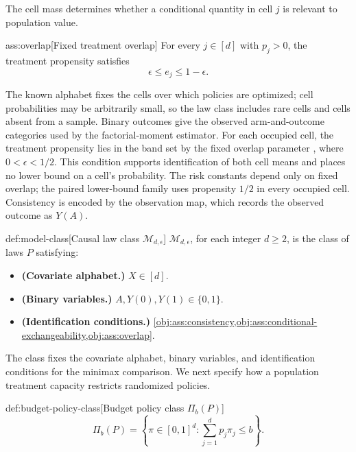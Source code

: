 \documentclass[11pt]{article}
\begin{document}
The cell mass  determines whether a conditional quantity in cell \(j\) is relevant to population value.

\begin{assumptionv}{ass:overlap}[Fixed treatment overlap]
For every \(j\in[d]\) with \(p_j>0\), the treatment propensity satisfies
\[
\epsilon\le e_j\le 1-\epsilon.
\]
\end{assumptionv}

The known alphabet fixes the cells over which policies are optimized; cell probabilities may be arbitrarily small, so the law class includes rare cells and cells absent from a sample. Binary outcomes give the observed arm-and-outcome categories used by the factorial-moment estimator. For each occupied cell, the treatment propensity  lies in the band set by the fixed overlap parameter , where \(0<\epsilon<1/2\). This condition supports identification of both cell means \citep{RosenbaumRubin1983} and places no lower bound on a cell’s probability. The risk constants depend only on fixed overlap; the paired lower-bound family uses propensity \(1/2\) in every occupied cell. Consistency is encoded by the observation map, which records the observed outcome as \(Y(A)\).

\begin{definitionv}{def:model-class}[Causal law class \(\mathcal M_{d,\epsilon}\)]
\(\mathcal M_{d,\epsilon}\), for each integer \(d\ge2\), is the class of laws \(P\) satisfying:
\begin{itemize}
\item \textbf{(Covariate alphabet.)} \(X\in[d]\).
\item \textbf{(Binary variables.)} \(A,Y(0),Y(1)\in\{0,1\}\).
\item \textbf{(Identification conditions.)} \cref{obj:ass:consistency,obj:ass:conditional-exchangeability,obj:ass:overlap}.
\end{itemize}
\end{definitionv}

The class  fixes the covariate alphabet, binary variables, and identification conditions for the minimax comparison. We next specify how a population treatment capacity restricts randomized policies.

\begin{definitionv}{def:budget-policy-class}[Budget policy class \(\Pi_b(P)\)]
\[
\Pi_b(P)=\left\{\pi\in[0,1]^d:\sum_{j=1}^d p_j\pi_j\le b\right\}.
\]
\end{definitionv}
\end{document}
